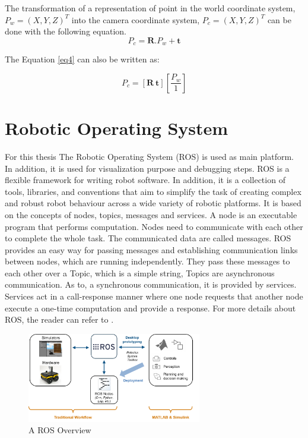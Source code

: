 The transformation of a representation of point in the world coordinate system, $ P_{w}=(X,Y,Z)^{T}$ into the camera coordinate system, $ P_{c}=(X,Y,Z)^{T}$ can be done with the following equation.
\begin{equation}\label{eq4} 
P_{c}=\textbf{R}.P_{w}+\textbf{t}
\end{equation}

 The Equation \ref{eq4} can also be written as:


\begin{equation}\label{eq5} 
    P_{c}=\left[\textbf{R} \ \textbf{t}\right]\left[\frac{P_{w}}{1}\right]   
\end{equation}

\section{Robotic Operating System}

For this thesis The Robotic Operating System (ROS) is used as main platform. In addition, it is used for visualization purpose and debugging steps. ROS is a flexible framework for writing robot software. In addition, it is  a collection of tools, libraries, and conventions that aim to simplify the task of creating complex and robust robot behaviour across a wide variety of robotic platforms. It is based on the concepts of nodes, topics, messages and services. A node is an executable program that performs computation. Nodes need to communicate with each other to complete the whole task. The communicated data are called messages. ROS provides an easy way for passing messages and establishing communication links between nodes, which are running independently. They pass these messages to each other over a Topic, which is a simple string, Topics are asynchronous communication. As to, a synchronous communication, it is provided by services. Services act in a call-response manner where one node requests that another node execute a one-time computation and provide a response. For more details about ROS, the reader can refer to \cite{ros}.

\begin{figure}[!h]
\begin{center}
\includegraphics[width=3in]{figures02/ros_workflows.png}
\caption{A ROS Overview}%
\end{center}
\end{figure}

